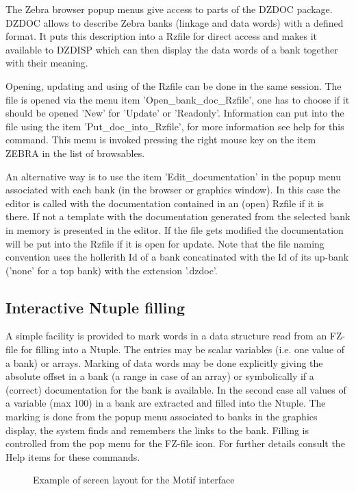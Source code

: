The Zebra browser popup menus give access to parts of the
DZDOC package. DZDOC allows to describe Zebra banks (linkage
and data words) with a defined format.
It puts this description into a Rzfile for direct access
and makes it available to DZDISP which can then display the
data words of a bank together with their meaning.
 
Opening, updating and using of the Rzfile can be done in the
same session. The file is opened via the menu item
'Open\_bank\_doc\_Rzfile', one has to choose if it should be
opened 'New' for 'Update' or 'Readonly'.
Information can put into the file using the item
'Put\_doc\_into\_Rzfile', for more information see help for this
command. This menu is invoked pressing the right mouse key on 
the item ZEBRA in the list of browsables.
 
An alternative way is to use the item 'Edit\_documentation' in
the popup menu associated with each bank (in the browser or
graphics window). In this case the editor is called with the
documentation contained in an (open) Rzfile if it is there.
If not a template with the documentation generated from the
selected bank in memory is presented in the editor.
If the file gets modified the documentation will be put into
the Rzfile if it is open for update. Note that the file
naming convention uses the hollerith Id of a bank
concatinated with the Id of its up-bank ('none' for a top
bank) with the extension '.dzdoc'.
 
\subsection{Interactive Ntuple filling}
 
A simple facility is provided to mark words in a data structure
read from an FZ-file for filling into a Ntuple. The entries may
be scalar variables (i.e. one value of a bank) or arrays. 
Marking of data words may be done explicitly giving the absolute
offset in a bank (a range in case of an array) or symbolically
if a (correct) documentation for the bank is available. In the
second case all values of a variable (max 100) in a bank are 
extracted and filled into the Ntuple. 
The marking is done from the popup menu associated to banks in
the graphics display, the system finds and remembers the links
to the bank.
Filling is controlled from the pop menu for the FZ-file icon.
For further details consult the Help items for these commands.
 
\begin{figure}[p]
  \begin{center}
     \mbox{}
     \vspace{-1.5cm}
    \caption{Example of screen layout for the Motif interface}
    \label{fig:DZDOCFIG6}
  \end{center}
\end{figure}
\clearpage 
